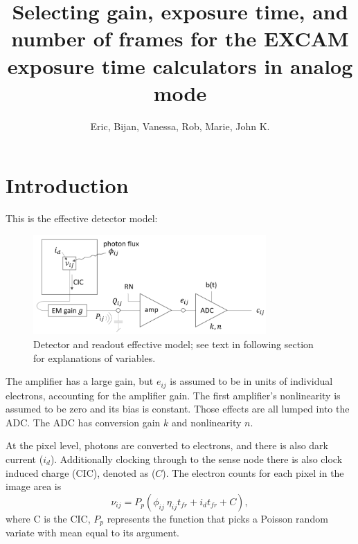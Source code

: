 \documentclass{article}
\title{Selecting gain, exposure time, and number of frames for the EXCAM exposure time calculators in analog mode}
\author{Eric, Bijan, Vanessa, Rob, Marie, John K.}
\begin{document}
\maketitle

\section{Introduction}
This is the effective detector model:
\begin{figure}[h]
    \centering
    \includegraphics[height=3.8cm]{revisedDetectorModelFigure.png}
    \caption{Detector and readout effective model; see text in following section for explanations of variables.}
    \label{fig:my_label}
\end{figure}
The amplifier has a large gain, but $e_{ij}$ is assumed to be in units of individual electrons, accounting for the amplifier gain. The first amplifier's nonlinearity is assumed to be zero and its bias is constant. Those effects are all lumped into the ADC.
The ADC has conversion gain $k$ and nonlinearity $n$.

At the pixel level, photons are converted to electrons, and there is also dark current ($i_d$). Additionally clocking through to the sense node there is also clock induced charge (CIC), denoted as ($C$).  The electron counts for each pixel in the image area is
\begin{equation}
\nu_{ij} = P_p\left( \phi_{ij}\ \eta_{ij} t_{fr} + i_d t_{fr} + C \right) ,
\end{equation}
where C is the CIC, $P_p$ represents the function that picks a Poisson random variate with mean equal to its argument.
\end{document}
